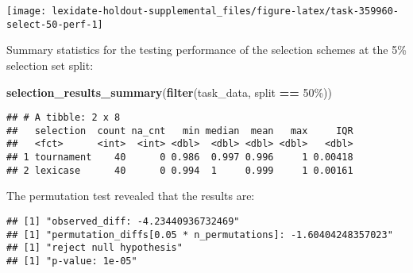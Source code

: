 \documentclass[
]{book}
\newenvironment{Shaded}{\begin{snugshade}}{\end{snugshade}}
\newcommand{\AttributeTok}[1]{\textcolor[rgb]{0.13,0.29,0.53}{#1}}
\newcommand{\DecValTok}[1]{\textcolor[rgb]{0.00,0.00,0.81}{#1}}
\newcommand{\FunctionTok}[1]{\textcolor[rgb]{0.13,0.29,0.53}{\textbf{#1}}}
\newcommand{\NormalTok}[1]{#1}
\newcommand{\OtherTok}[1]{\textcolor[rgb]{0.56,0.35,0.01}{#1}}
\newcommand{\SpecialCharTok}[1]{\textcolor[rgb]{0.81,0.36,0.00}{\textbf{#1}}}
\newcommand{\StringTok}[1]{\textcolor[rgb]{0.31,0.60,0.02}{#1}}
\begin{document}
\texttt{[image: lexidate-holdout-supplemental\_files/figure-latex/task-359960-select-50-perf-1]}

Summary statistics for the testing performance of the selection schemes at the 5\% selection set split:

\begin{Shaded}
\begin{Highlighting}[]
\FunctionTok{selection\_results\_summary}\NormalTok{(}\FunctionTok{filter}\NormalTok{(task\_data, split }\SpecialCharTok{==} \StringTok{\textquotesingle{}50\%\textquotesingle{}}\NormalTok{))}
\end{Highlighting}
\end{Shaded}

\begin{verbatim}
## # A tibble: 2 x 8
##   selection  count na_cnt   min median  mean   max     IQR
##   <fct>      <int>  <int> <dbl>  <dbl> <dbl> <dbl>   <dbl>
## 1 tournament    40      0 0.986  0.997 0.996     1 0.00418
## 2 lexicase      40      0 0.994  1     0.999     1 0.00161
\end{verbatim}

The permutation test revealed that the results are:

\begin{Shaded}
\end{Shaded}

\begin{verbatim}
## [1] "observed_diff: -4.23440936732469"
## [1] "permutation_diffs[0.05 * n_permutations]: -1.60404248357023"
## [1] "reject null hypothesis"
## [1] "p-value: 1e-05"
\end{verbatim}
\end{document}
